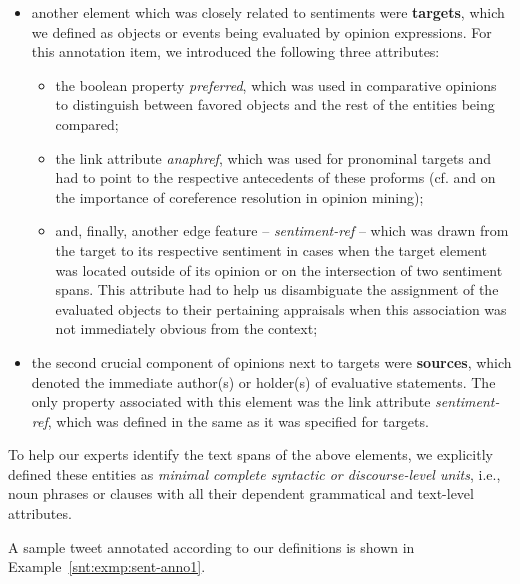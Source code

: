 \begin{itemize}
\item
  another element which was closely related to sentiments were
  \textbf{targets}, which we defined as objects or events being
  evaluated by opinion expressions.  For this annotation item, we
  introduced the following three attributes:
  \begin{itemize}
    \item
      the boolean property \emph{preferred}, which was used in
      comparative opinions to distinguish between favored objects and
      the rest of the entities being compared;
    \item
      the link attribute \emph{anaphref}, which was used for
      pronominal targets and had to point to the respective
      antecedents of these proforms (cf. \citet{Stoyanov:06} and
      \citet{Ding:10} on the importance of coreference resolution in
      opinion mining);
    \item
      and, finally, another edge feature -- \emph{sentiment-ref} --
      which was drawn from the target to its respective sentiment in
      cases when the target element was located outside of its opinion
      or on the intersection of two sentiment spans.  This attribute
      had to help us disambiguate the assignment of the evaluated
      objects to their pertaining appraisals when this association was
      not immediately obvious from the context;
  \end{itemize}

\item
  the second crucial component of opinions next to targets were
  \textbf{sources}, which denoted the immediate author(s) or holder(s)
  of evaluative statements.  The only property associated with this
  element was the link attribute \emph{sentiment-ref}, which was
  defined in the same as it was specified for targets.
\end{itemize}

To help our experts identify the text spans of the above elements, we
explicitly defined these entities as \emph{minimal complete syntactic
  or discourse-level units}, i.e., noun phrases or clauses with all
their dependent grammatical and text-level attributes.

A sample tweet annotated according to our definitions is shown in
Example~\ref{snt:exmp:sent-anno1}.

\begin{example}\label{snt:exmp:sent-anno1}
  \upshape{}\\[0.8em]
  \noindent{}
\end{example}

